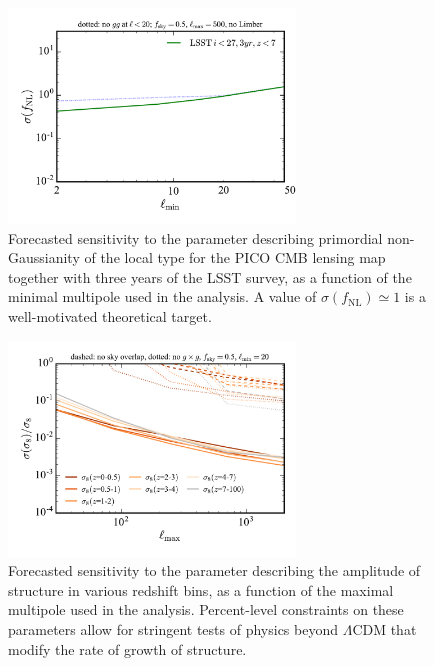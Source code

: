 \documentclass[PICOReport.tex]{subfiles}
\begin{document}
\begin{figure}
\hspace{-0.in}
\parbox{3.1in}{\centerline {
\includegraphics[width=3.0in]{images/fnl_PICOv4.1b_deproj0_SENS0.pdf} } }
\hspace{0.in}
\parbox{3.5in}{
\caption{\label{fig:fnlconstraint} Forecasted sensitivity to  the parameter describing primordial non-Gaussianity of the local type for the PICO CMB lensing map together with three years of the LSST survey, as a function of the minimal multipole used in the analysis. A value of $\sigma (f_\mathrm{NL}) \simeq 1$ is a well-motivated theoretical target.  } }
\vspace{-0.1in}
\end{figure}

\begin{figure}
\hspace{-0.in}
\parbox{3.1in}{\centerline {
\includegraphics[width=3.0in]{images/sigma8_PICOv4.1b_deproj0_SENS0.pdf} } }
\hspace{0.in}
\parbox{3.5in}{
\caption{\label{fig:sigma8constraint} Forecasted sensitivity to  the parameter describing the amplitude of structure in various redshift bins, as a function of the maximal multipole used in the analysis.  Percent-level constraints on these parameters allow for stringent tests of physics beyond $\Lambda$CDM that modify the rate of growth of structure. } }
\vspace{-0.1in}
\end{figure}
\end{document}
